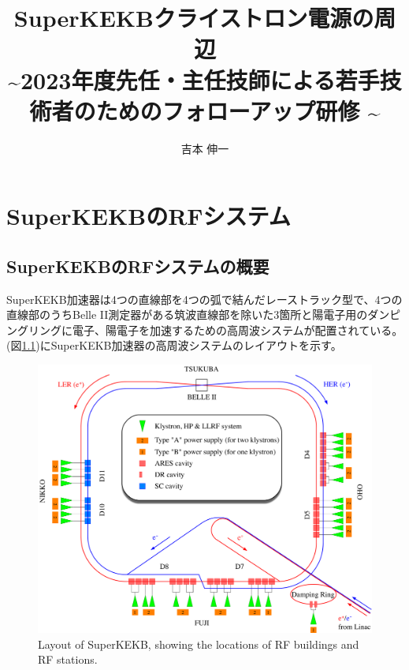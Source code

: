 \documentclass[book,openany]{jlreq}
\theoremstyle{definition}
\begin{document}
\title{\Large{SuperKEKBクライストロン電源の周辺}\\
    \normalsize{\textasciitilde 2023年度先任・主任技師による若手技術者のためのフォローアップ研修 \textasciitilde}}
\author{吉本 伸一}
\maketitle
\tableofcontents
\clearpage

\chapter{SuperKEKBのRFシステム}

\section{SuperKEKBのRFシステムの概要}

SuperKEKB加速器は4つの直線部を4つの弧で結んだレーストラック型で、4つの直線部のうちBelle II測定器がある筑波直線部を除いた3箇所と陽電子用のダンピングリングに電子、陽電子を加速するための高周波システムが配置されている。(図\ref{layout})にSuperKEKB加速器の高周波システムのレイアウトを示す。
%
\begin{figure}[!htt]
    \begin{center}
        \includegraphics[width=\linewidth]{figs/SKEKB-RF.pdf}
        \caption{Layout of SuperKEKB, showing the locations of RF buildings and RF stations.}
        \label{layout}
    \end{center}
\end{figure}
\end{document}
